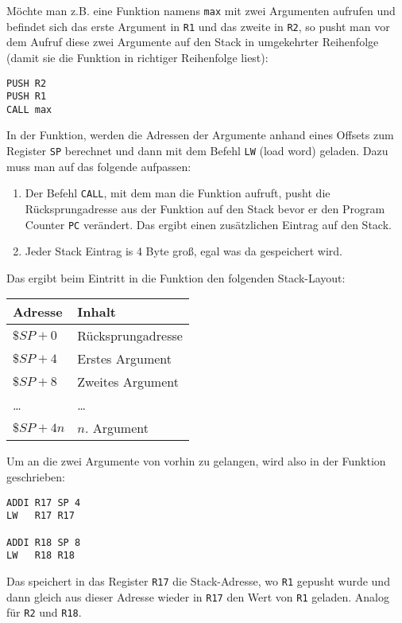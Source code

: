 Möchte man z.B. eine Funktion namens \texttt{max} mit zwei Argumenten aufrufen
und befindet sich das erste Argument in \texttt{R1} und das zweite in
\texttt{R2}, so pusht man vor dem Aufruf diese zwei Argumente auf den Stack in
umgekehrter Reihenfolge (damit sie die Funktion in richtiger Reihenfolge liest):
\begin{lstlisting}
PUSH R2
PUSH R1
CALL max
\end{lstlisting}
In der Funktion, werden die Adressen der Argumente anhand eines Offsets zum
Register \texttt{SP} berechnet und dann mit dem Befehl \texttt{LW} (load word)
geladen. Dazu muss man auf das folgende aufpassen:
\begin{enumerate}
 \item Der Befehl \texttt{CALL}, mit dem man die Funktion aufruft, pusht die
       Rücksprungadresse aus der Funktion auf den Stack bevor er den Program
       Counter \texttt{PC} verändert. Das ergibt einen zusätzlichen Eintrag 
       auf den Stack.
 \item Jeder Stack Eintrag is 4 Byte groß, egal was da gespeichert wird.
\end{enumerate}
Das ergibt beim Eintritt in die Funktion den folgenden Stack-Layout:
\begin{center}
 \begin{tabular}{ll}
  Adresse     & Inhalt \\\hline
  $\$SP + 0$  & Rücksprungadresse \\
  $\$SP + 4$  & Erstes Argument   \\
  $\$SP + 8$  & Zweites Argument  \\
  \ldots      & \ldots            \\
  $\$SP + 4n$ & $n$. Argument
 \end{tabular}
\end{center}
Um an die zwei Argumente von vorhin zu gelangen, wird also in der Funktion
geschrieben:
\begin{lstlisting}
ADDI R17 SP 4
LW   R17 R17

ADDI R18 SP 8
LW   R18 R18
\end{lstlisting}
Das speichert in das Register \texttt{R17} die Stack-Adresse, wo \texttt{R1}
gepusht wurde und dann gleich aus dieser Adresse wieder in \texttt{R17} den
Wert von \texttt{R1} geladen. Analog für \texttt{R2} und \texttt{R18}.


